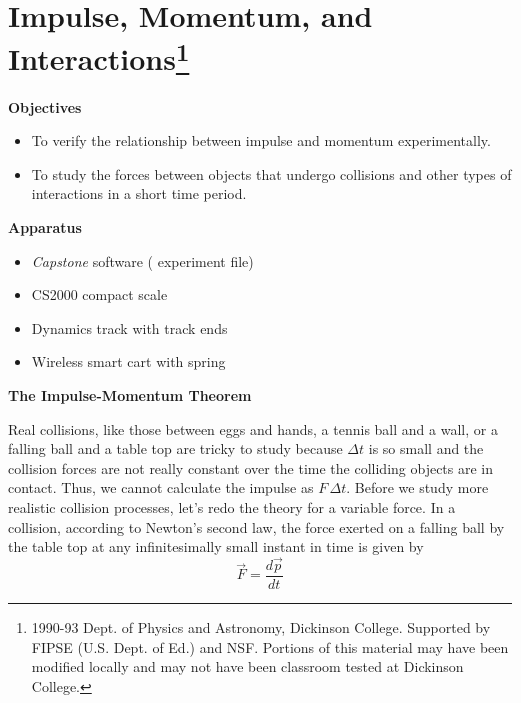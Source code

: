 \section{Impulse, Momentum, and Interactions\footnote{
1990-93 Dept. of Physics and Astronomy, Dickinson College. Supported by FIPSE
(U.S. Dept. of Ed.) and NSF. Portions of this material may have been modified
locally and may not have been classroom tested at Dickinson College.
}}

\makelabheader %

\medskip
\textbf{Objectives }

\begin{itemize}[nosep]
\item To verify the relationship between impulse and momentum experimentally. 
\item To study the forces between objects that undergo collisions and other types of interactions in a short time period.
\end{itemize}

\medskip
\textbf{Apparatus} 
\begin{itemize}[nosep]
\item \textit{Capstone} software ( experiment file)
\item CS2000 compact scale
\item Dynamics track with track ends
\item Wireless smart cart with spring 
\end{itemize}
\textbf{The Impulse-Momentum Theorem }

Real collisions, like those between eggs and hands, a tennis ball and a wall, or
a falling ball and a table top are tricky to study because $\Delta t$ 
is so small and
the collision forces are not really constant over the time the colliding objects
are in contact. Thus, we cannot calculate the impulse as $F \,\Delta t$. 
Before we study
more realistic collision processes, let's redo the theory for a variable force.
In a collision, according to Newton's second law, the force exerted on a falling
ball by the table top at any infinitesimally small instant in time is given
by
\begin{equation}
{\vec  F}=\frac{d{\vec  p}}{dt}
\end{equation}

